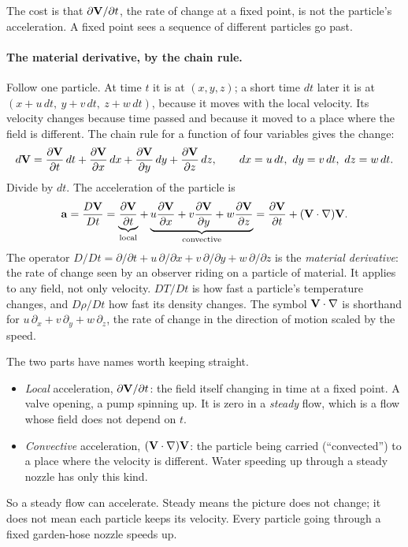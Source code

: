 The cost is that $\partial \mathbf{V} / \partial t$, the rate of change at a fixed point, is not the particle's acceleration. A fixed point sees a sequence of different particles go past.

\paragraph{The material derivative, by the chain rule.} Follow one particle. At time $t$ it is at $(x,y,z)$; a short time $dt$ later it is at $(x + u\,dt,\ y + v\,dt,\ z + w\,dt)$, because it moves with the local velocity. Its velocity changes because time passed and because it moved to a place where the field is different. The chain rule for a function of four variables gives the change:
\[
d\mathbf{V} = \frac{\partial \mathbf{V}}{\partial t}\,dt + \frac{\partial \mathbf{V}}{\partial x}\,dx + \frac{\partial \mathbf{V}}{\partial y}\,dy + \frac{\partial \mathbf{V}}{\partial z}\,dz,
\qquad dx = u\,dt,\ dy = v\,dt,\ dz = w\,dt .
\]
Divide by $dt$. The acceleration of the particle is
\begin{equation}
\mathbf{a} = \frac{D\mathbf{V}}{Dt} = \underbrace{\frac{\partial \mathbf{V}}{\partial t}}_{\text{local}} + \underbrace{u\frac{\partial \mathbf{V}}{\partial x} + v\frac{\partial \mathbf{V}}{\partial y} + w\frac{\partial \mathbf{V}}{\partial z}}_{\text{convective}}
= \frac{\partial \mathbf{V}}{\partial t} + (\mathbf{V} \cdot \nabla)\mathbf{V} .
\label{eq:materialderivative}
\end{equation}
The operator $D/Dt = \partial/\partial t + u\,\partial/\partial x + v\,\partial/\partial y + w\,\partial/\partial z$ is the \emph{material derivative}: the rate of change seen by an observer riding on a particle of material. It applies to any field, not only velocity. $DT/Dt$ is how fast a particle's temperature changes, and $D\rho/Dt$ how fast its density changes. The symbol $\mathbf{V} \cdot \nabla$ is shorthand for $u\,\partial_x + v\,\partial_y + w\,\partial_z$, the rate of change in the direction of motion scaled by the speed.

The two parts have names worth keeping straight.
\begin{itemize}[nosep,leftmargin=*]
\item \emph{Local} acceleration, $\partial \mathbf{V}/\partial t$: the field itself changing in time at a fixed point. A valve opening, a pump spinning up. It is zero in a \emph{steady} flow, which is a flow whose field does not depend on $t$.
\item \emph{Convective} acceleration, $(\mathbf{V}\cdot\nabla)\mathbf{V}$: the particle being carried (``convected'') to a place where the velocity is different. Water speeding up through a steady nozzle has only this kind.
\end{itemize}
So a steady flow can accelerate. Steady means the picture does not change; it does not mean each particle keeps its velocity. Every particle going through a fixed garden-hose nozzle speeds up.

